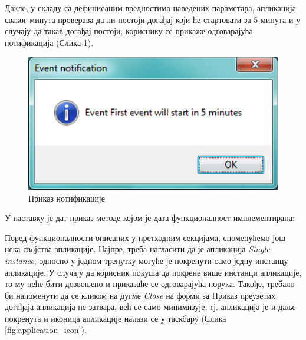 

Дакле, у складу са дефинисаним вредностима наведених параметара, апликација сваког минута проверава да ли постоји догађај који ће стартовати за 5 минута и у случају да такав догађај постоји, кориснику се прикаже одговарајућа нотификација (Слика \ref{fig:event_notification}).

\begin{figure}[H]
	\centering
	\includegraphics[scale=0.5]{slike/EventNotification.png}
	\caption{Приказ нотификације}
	\label{fig:event_notification}
\end{figure}

У наставку је дат приказ методе којом је дата функционалност имплементирана:


Поред функционалности описаних у претходним секцијама, споменућемо још нека свoјства апликације. Најпре, треба нагласити да је апликација \textit{Single instance}, односно у једном тренутку могуће је покренути само једну инстанцу апликације. У случају да корисник покуша да покрене више инстанци апликације, то му неће бити дозвоњено и приказаће се одговарајућа порука. 
Такође, требало би напоменути да се кликом на дугме \textit{Close} на форми за Приказ преузетих догађаја апликација не затвара, већ се само минимизује, тј. апликација је и даље покренута и иконица апликације налази се у таскбару (Слика \ref{fig:application_icon}).

